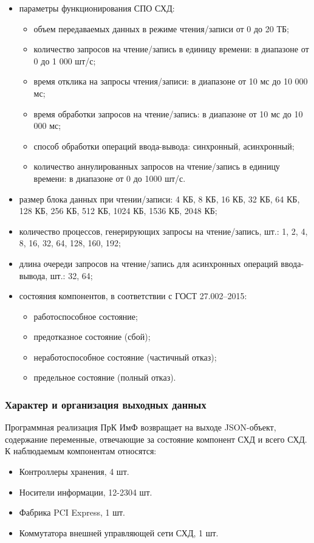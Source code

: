 \begin{itemize}
\begin{itemize}
	\end{itemize}
	\item параметры функционирования СПО СХД:
	\begin{itemize}
		\item объем передаваемых данных в режиме чтения/записи от 0 до 20 ТБ;
		\item количество запросов на чтение/запись в единицу времени: в диапазоне от 0 до 1 000 шт/с;
		\item время отклика на запросы чтения/записи: в диапазоне от 10 мс до 10 000 мс;
		\item время обработки запросов на чтение/запись: в диапазоне от 10 мс до 10 000 мс;
		\item способ обработки операций ввода-вывода: синхронный, асинхронный;
		\item количество аннулированных запросов на чтение/запись в единицу времени: в диапазоне от 0 до 1000 шт/с.
	\end{itemize}
	\item размер блока данных при чтении/записи: 4 КБ, 8 КБ, 16 КБ, 32 КБ, 64 КБ, 128 КБ, 256 КБ, 512 КБ, 1024 КБ, 1536 КБ, 2048 КБ;
	\item количество процессов, генерирующих запросы на чтение/запись, шт.: 1, 2, 4, 8, 16, 32, 64, 128, 160, 192;
	\item длина очереди запросов на чтение/запись для асинхронных операций ввода- вывода, шт.: 32, 64;
	\item состояния компонентов, в соответствии с ГОСТ 27.002–2015:
	\begin{itemize}
		\item работоспособное состояние;
		\item предотказное состояние (сбой);
		\item неработоспособное состояние (частичный отказ);
		\item предельное состояние (полный отказ).
	\end{itemize}
\end{itemize}


\subsubsection{Характер и организация выходных данных}

Программная реализация ПрК ИмФ возвращает на выходе JSON-объект, содержание переменные, отвечающие за состояние компонент СХД и всего СХД. К наблюдаемым компонентам относятся:
\begin{itemize}
	\item Контроллеры хранения, 4 шт.
	\item Носители информации, 12-2304 шт.
	\item Фабрика PCI Express, 1 шт.
	\item Коммутатора внешней управляющей сети СХД, 1 шт.
\end{itemize} 

